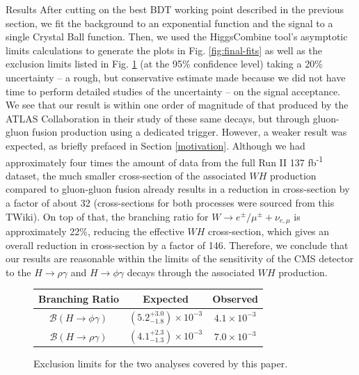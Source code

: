 \begin{section}{Results}\label{results}
After cutting on the best BDT working point described in the previous section, we fit the background to an exponential function and the signal to a single Crystal Ball function. Then, we used the HiggsCombine tool's asymptotic limits calculations\cite{cite-hcomb} to generate the plots in Fig. \ref{fig:final-fits} as well as the exclusion limits listed in Fig. \ref{fig:exclude-lims} (at the 95\% confidence level) taking a 20\% uncertainty -- a rough, but conservative estimate made because we did not have time to perform detailed studies of the uncertainty -- on the signal acceptance. We see that our result is within one order of magnitude of that produced by the ATLAS Collaboration in their study\cite{cite-rpg-brs} of these same decays, but through gluon-gluon fusion production using a dedicated trigger. However, a weaker result was expected, as briefly prefaced in Section \ref{motivation}. Although we had approximately four times the amount of data from the full Run II 137 fb\textsuperscript{-1} dataset, the much smaller cross-section of the associated $WH$ production compared to gluon-gluon fusion already results in a reduction in cross-section by a factor of about 32 (cross-sections for both processes were sourced from this TWiki\cite{cite-xsecs}). On top of that, the branching ratio\cite{cite-Wleps-brs} for $W\rightarrow e^{\pm}/\mu^{\pm}+\nu_{e,\mu}$ is approximately 22\%, reducing the effective $WH$ cross-section, which gives an overall reduction in cross-section by a factor of 146. Therefore, we conclude that our results are reasonable within the limits of the sensitivity of the CMS detector to the $H\rightarrow\rho\gamma$ and $H\rightarrow\phi\gamma$ decays through the associated $WH$ production.\\

\begin{figure}[htb]
\centering
\begin{tabular}{ccc}
\toprule
Branching Ratio & Expected & Observed \\
\midrule
$\mathcal{B}(H\rightarrow\phi\gamma)$ & $(5.2^{+3.0}_{-1.8})\times10^{-3}$ & $4.1\times10^{-3}$ \\
$\mathcal{B}(H\rightarrow\rho\gamma)$ & $(4.1^{+2.3}_{-1.3})\times10^{-3}$ & $7.0\times10^{-3}$ \\
\bottomrule
\end{tabular}
\caption{Exclusion limits for the two analyses covered by this paper.}
\label{fig:exclude-lims}
\end{figure}


\end{section}

